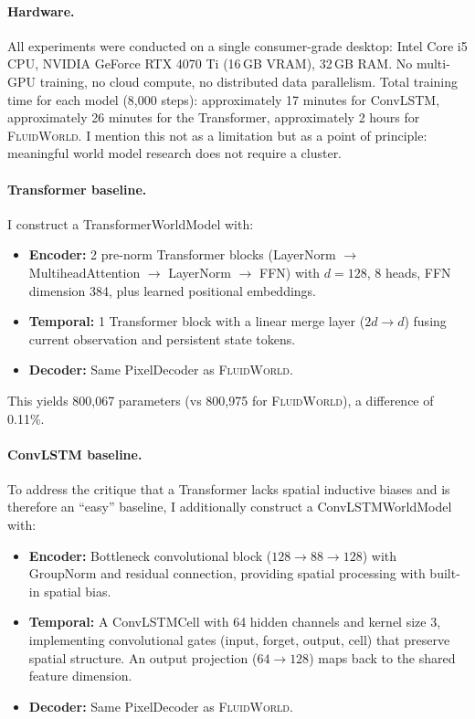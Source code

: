 \documentclass{article}
\newcommand{\fluidworld}{\textsc{FluidWorld}}
\begin{document}
\paragraph{Hardware.} All experiments were conducted on a single consumer-grade desktop: Intel Core i5 CPU, NVIDIA GeForce RTX 4070 Ti (16\,GB VRAM), 32\,GB RAM. No multi-GPU training, no cloud compute, no distributed data parallelism. Total training time for each model (8,000 steps): approximately 17 minutes for ConvLSTM, approximately 26 minutes for the Transformer, approximately 2 hours for \fluidworld{}. I mention this not as a limitation but as a point of principle: meaningful world model research does not require a cluster.

\paragraph{Transformer baseline.} I construct a TransformerWorldModel with:
\begin{itemize}
    \item \textbf{Encoder:} 2 pre-norm Transformer blocks (LayerNorm $\to$ MultiheadAttention $\to$ LayerNorm $\to$ FFN) with $d=128$, 8 heads, FFN dimension 384, plus learned positional embeddings.
    \item \textbf{Temporal:} 1 Transformer block with a linear merge layer ($2d \to d$) fusing current observation and persistent state tokens.
    \item \textbf{Decoder:} Same PixelDecoder as \fluidworld{}.
\end{itemize}

This yields 800,067 parameters (vs 800,975 for \fluidworld{}), a difference of 0.11\%.

\paragraph{ConvLSTM baseline.} To address the critique that a Transformer lacks spatial inductive biases and is therefore an ``easy'' baseline, I additionally construct a ConvLSTMWorldModel~\cite{shi2015convlstm} with:
\begin{itemize}
    \item \textbf{Encoder:} Bottleneck convolutional block ($128 \to 88 \to 128$) with GroupNorm and residual connection, providing spatial processing with built-in spatial bias.
    \item \textbf{Temporal:} A ConvLSTMCell with 64 hidden channels and kernel size 3, implementing convolutional gates (input, forget, output, cell) that preserve spatial structure. An output projection ($64 \to 128$) maps back to the shared feature dimension.
    \item \textbf{Decoder:} Same PixelDecoder as \fluidworld{}.
\end{itemize}
\end{document}
